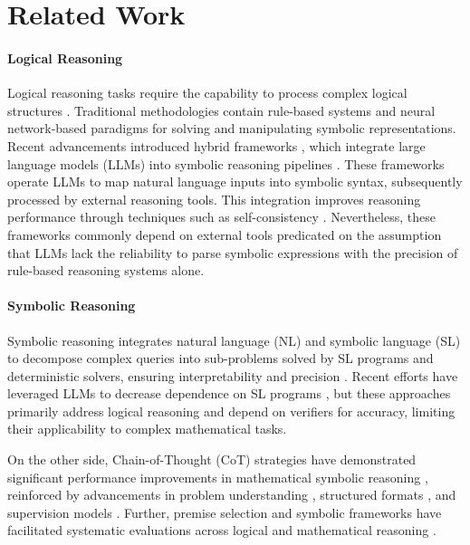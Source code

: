 \documentclass[11pt]{article}
\begin{document}
\section{Related Work}

\paragraph{Logical Reasoning} Logical reasoning tasks require the capability to process complex logical structures \cite{cummins1991conditional}. Traditional methodologies contain rule-based systems \cite{robinson1965machine} and neural network-based paradigms \cite{amayuelas2022neural,gerasimova2023comparative} for solving and manipulating symbolic representations. Recent advancements introduced hybrid frameworks \cite{pan2023logic,ye2024satlm,jiang2024leanreasoner}, which integrate large language models (LLMs) into symbolic reasoning pipelines \cite{quan2024verificationrefinementnaturallanguage}. These frameworks operate LLMs to map natural language inputs into symbolic syntax, subsequently processed by external reasoning tools. This integration improves reasoning performance through techniques such as self-consistency \cite{wang2023plan,zhang2022automatic}. Nevertheless, these frameworks commonly depend on external tools predicated on the assumption that LLMs lack the reliability to parse symbolic expressions with the precision of rule-based reasoning systems alone.

\paragraph{Symbolic Reasoning}
Symbolic reasoning integrates natural language (NL) and symbolic language (SL) to decompose complex queries into sub-problems solved by SL programs and deterministic solvers, ensuring interpretability and precision \cite{lyu2023faithful}. Recent efforts have leveraged LLMs to decrease dependence on SL programs \cite{xu2024faithful}, but these approaches primarily address logical reasoning and depend on verifiers for accuracy, limiting their applicability to complex mathematical tasks.

On the other side, Chain-of-Thought (CoT) strategies have demonstrated significant performance improvements in mathematical symbolic reasoning \cite{jiang2024llms}, reinforced by advancements in problem understanding \cite{zhong2024achieving}, structured formats \cite{tam2024let}, and supervision models \cite{ranaldi2024aligning,ranaldi-freitas-2024-self,jiang2024rationalystpretrainingprocesssupervisionimproving}. Further, premise selection and symbolic frameworks have facilitated systematic evaluations across logical and mathematical reasoning \cite{meadows2023symbolic,ferreira2020premise}.
\end{document}

